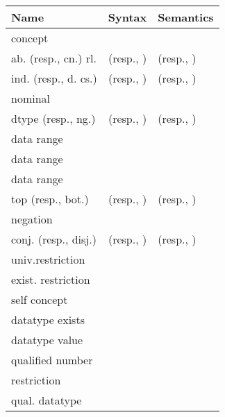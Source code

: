 \documentclass[a4paper]{llncs}
\begin{document}
{\small
\begin{longtable}{|>{\centering}m{2.5cm}|c|>{\centering\arraybackslash}m{7.5cm}|}
\hline
Name & Syntax & Semantics \\
\hline

concept &  & \\

ab. (resp., cn.) rl. &  (resp.,  )&  \hspace*{0.5cm} (resp., )\\



\scriptsize{ind. (resp., d. cs.)}&  (resp., )&  (resp., )\\

nominal &  & \\

dtype  (resp., ng.) &  (resp., )&  (resp., )\\





\hline
data range  & &  \\

data range   &   & \\

data range    &  &  \\

\hline

top (resp., bot.) &  (resp.,  )&   (resp., )\\



negation &  &  \\

conj. (resp., disj.) &  (resp., )&   (resp., )\\



univ.restriction & &  \\

exist. restriction &  &   \\

self concept &  &  \\

datatype exists &  & \\

datatype value &  & \\

qualified number  &   & \\

restriction&  &  \\

qual. datatype   &   & \\


\end{longtable}}
\end{document}
